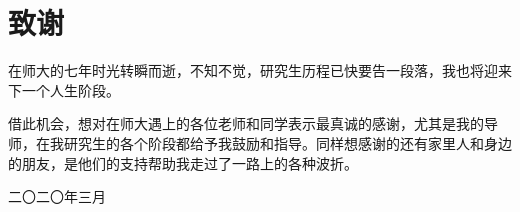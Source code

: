 \chapter*{ 致\qquad 谢}


在师大的七年时光转瞬而逝，不知不觉，研究生历程已快要告一段落，我也将迎来下一个人生阶段。

借此机会，想对在师大遇上的各位老师和同学表示最真诚的感谢，尤其是我的导师，在我研究生的各个阶段都给予我鼓励和指导。同样想感谢的还有家里人和身边的朋友，是他们的支持帮助我走过了一路上的各种波折。


\vspace{0.2cm} \hspace{11.5cm}

\hspace{10.6cm}  二〇二〇年三月
